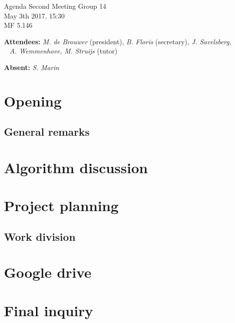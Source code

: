 \documentclass[a4paper,twoside,11pt]{article}
\title{}
\date{}
\begin{document}

\begin{center}
\Huge{Agenda Second Meeting Group 14}
\\\vspace*{2mm}
\Large{May 3th 2017, 15:30}
\\\vspace*{2mm}
\large{MF 5.146}
\\
		\end{center}

		\textbf{Attendees:} \textit{M. de Brouwer} (president), \textit{B. Floris} (secretary), \textit{J. Savelsberg, 
\\\indent\qquad\,\,\,\,\,\qquad\quad A. Wemmenhove, M. Struijs} (tutor)

		\textbf{Absent:} \textit{S. Marin}

	\section{Opening}
	\subsection*{\hspace{1.9em}General remarks}

	\section{Algorithm discussion}
	
	\section{Project planning}
		\subsection*{\hspace{1.9em}Work division}
	
	\section{Google drive}

	\section{Final inquiry}

	
\end{document}
